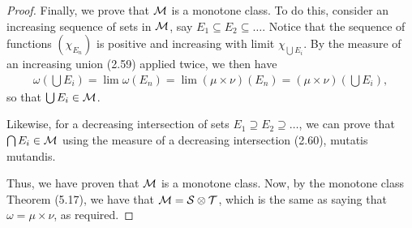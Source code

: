 \begin{proof}
Finally, we prove that $\mathcal{M}$ is a monotone class. 
To do this, consider an increasing sequence of sets in $\mathcal{M}$, say $E_1 \subseteq E_2 \subseteq \dots$.
Notice that the sequence of functions $(\chi_{E_n})$ is positive and increasing with limit $\chi_{\bigcup E_i}$.
By the measure of an increasing union (2.59) applied twice, we then have
\begin{align*}
    \omega(\bigcup E_i)
    = \lim \omega(E_n)
    = \lim (\mu \times \nu)(E_n)
    = (\mu \times \nu)(\bigcup E_i),
\end{align*}
so that $\bigcup E_i \in \mathcal{M}$.

Likewise, for a decreasing intersection of sets $E_1 \supseteq E_2 \supseteq \dots$, we can prove that $\bigcap E_i \in \mathcal{M}$ using the measure of a decreasing intersection (2.60), mutatis mutandis.

Thus, we have proven that $\mathcal{M}$ is a monotone class. 
Now, by the monotone class Theorem (5.17), we have that $\mathcal{M} = \mathcal{S} \otimes \mathcal{T}$, which is the same as saying that $\omega = \mu \times \nu$, as required.
\end{proof} 
